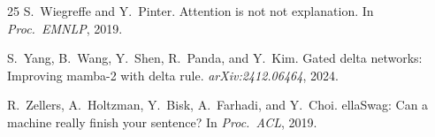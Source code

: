\documentclass[11pt,twocolumn]{article}
\begin{document}
\begin{thebibliography}{25}
S.~Wiegreffe and Y.~Pinter.
\newblock Attention is not not explanation.
\newblock In \emph{Proc.\ EMNLP}, 2019.

S.~Yang, B.~Wang, Y.~Shen, R.~Panda, and Y.~Kim.
\newblock Gated delta networks: Improving mamba-2 with delta rule.
\newblock \emph{arXiv:2412.06464}, 2024.

R.~Zellers, A.~Holtzman, Y.~Bisk, A.~Farhadi, and Y.~Choi.
ella{S}wag: Can a machine really finish your sentence?
\newblock In \emph{Proc.\ ACL}, 2019.

\end{thebibliography}
\end{document}
